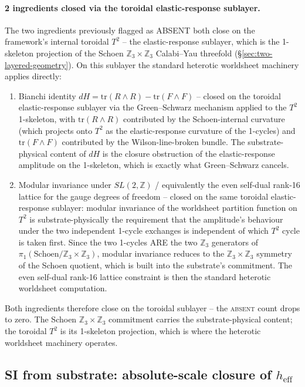 ﻿\documentclass[reprint,amsmath,amssymb,aps,prd,longbibliography,floatfix]{revtex4-2}
\begin{document}
\paragraph{2 ingredients closed via the toroidal elastic-response
sublayer.} The two ingredients previously flagged as ABSENT both
close on the framework's internal toroidal $T^2$ -- the elastic-response
sublayer, which is the 1-skeleton projection of the Schoen
$\mathbb{Z}_3 \times \mathbb{Z}_3$ Calabi--Yau threefold
(\S\ref{sec:two-layered-geometry}). On this sublayer the standard
heterotic worldsheet machinery applies directly:
\begin{enumerate}
\item Bianchi identity $dH = \mathrm{tr}(R \wedge R) - \mathrm{tr}(F \wedge F)$
-- closed on the toroidal elastic-response sublayer via the
Green--Schwarz mechanism applied to the $T^2$ 1-skeleton, with
$\mathrm{tr}(R \wedge R)$ contributed by the Schoen-internal
curvature (which projects onto $T^2$ as the elastic-response
curvature of the 1-cycles) and $\mathrm{tr}(F \wedge F)$
contributed by the Wilson-line-broken bundle. The substrate-physical
content of $dH$ is the closure obstruction of the elastic-response
amplitude on the 1-skeleton, which is exactly what
Green--Schwarz cancels.
\item Modular invariance under $SL(2, \mathbb{Z})$ / equivalently
the even self-dual rank-16 lattice for the gauge degrees of freedom
-- closed on the same toroidal elastic-response sublayer: modular
invariance of the worldsheet partition function on $T^2$ is
substrate-physically the requirement that the amplitude's behaviour
under the two independent 1-cycle exchanges is independent of which
$T^2$ cycle is taken first. Since the two 1-cycles ARE the two
$\mathbb{Z}_3$ generators of $\pi_1(\mathrm{Schoen}/\mathbb{Z}_3
\times \mathbb{Z}_3)$, modular invariance reduces to the
$\mathbb{Z}_3 \times \mathbb{Z}_3$ symmetry of the Schoen quotient,
which is built into the substrate's commitment. The even self-dual
rank-16 lattice constraint is then the standard heterotic
worldsheet computation.
\end{enumerate}
Both ingredients therefore close on the toroidal sublayer -- the
\textsc{absent} count drops to zero. The Schoen
$\mathbb{Z}_3 \times \mathbb{Z}_3$ commitment carries the
substrate-physical content; the toroidal $T^2$ is its
1-skeleton projection, which is where the heterotic worldsheet
machinery operates.

\subsection{SI from substrate: absolute-scale closure of $h_\mathrm{eff}$}
\label{sec:si-from-substrate}
\end{document}
